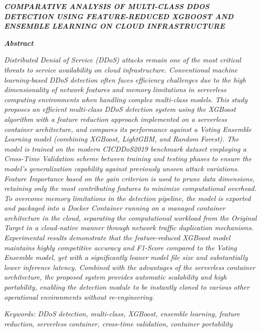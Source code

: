 \documentclass[10pt,a4paper]{article}
\begin{document}
\begin{center}
\vspace{20pt}

{\fontsize{12pt}{14pt}\selectfont\textbf{\textit{COMPARATIVE ANALYSIS OF MULTI-CLASS DDOS DETECTION USING FEATURE-REDUCED XGBOOST AND ENSEMBLE LEARNING ON CLOUD INFRASTRUCTURE}}}

\vspace{10pt}

{\fontsize{10pt}{12pt}\selectfont\textbf{\textit{Abstract}}}

\vspace{10pt}

\begin{justify}
{\fontsize{10pt}{12pt}\selectfont\textit{%
Distributed Denial of Service (DDoS) attacks remain one of the most critical threats to service availability on cloud infrastructure. Conventional machine learning-based DDoS detection often faces efficiency challenges due to the high dimensionality of network features and memory limitations in serverless computing environments when handling complex multi-class models. This study proposes an efficient multi-class DDoS detection system using the XGBoost algorithm with a feature reduction approach implemented on a serverless container architecture, and compares its performance against a Voting Ensemble Learning model (combining XGBoost, LightGBM, and Random Forest). The model is trained on the modern CICDDoS2019 benchmark dataset employing a Cross-Time Validation scheme between training and testing phases to ensure the model's generalization capability against previously unseen attack variations. Feature Importance based on the gain criterion is used to prune data dimensions, retaining only the most contributing features to minimize computational overhead. To overcome memory limitations in the detection pipeline, the model is exported and packaged into a Docker Container running on a managed container architecture in the cloud, separating the computational workload from the Original Target in a cloud-native manner through network traffic duplication mechanisms. Experimental results demonstrate that the feature-reduced XGBoost model maintains highly competitive accuracy and F1-Score compared to the Voting Ensemble model, yet with a significantly leaner model file size and substantially lower inference latency. Combined with the advantages of the serverless container architecture, the proposed system provides automatic scalability and high portability, enabling the detection module to be instantly cloned to various other operational environments without re-engineering.
}}
\end{justify}

\vspace{10pt}

{\fontsize{10pt}{12pt}\selectfont\textit{Keywords: DDoS detection, multi-class, XGBoost, ensemble learning, feature reduction, serverless container, cross-time validation, container portability}}

\vspace{10pt}

\end{center}
\end{document}
